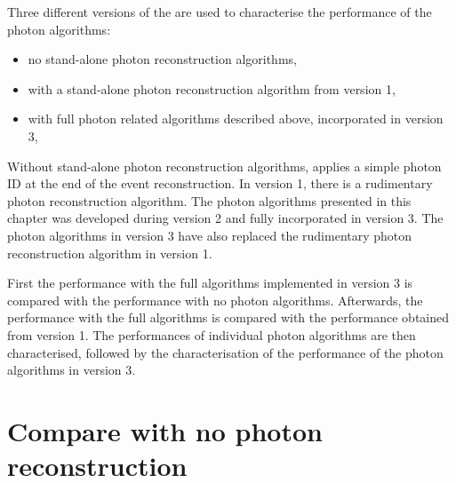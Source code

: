 
Three different versions of the \pandora are used to characterise  the performance of the photon algorithms:
\begin{itemize}
  \item no stand-alone photon reconstruction algorithms,
  \item with a stand-alone photon reconstruction algorithm from \pandora version 1,
  \item with full photon related algorithms described above, incorporated in \pandora version 3,
\end{itemize}

Without stand-alone photon reconstruction algorithms, \pandora applies a simple photon ID at the end of the event reconstruction. In \pandora version 1, there is a rudimentary photon reconstruction algorithm. The photon algorithms presented in this chapter was developed during \pandora version 2 and fully incorporated in \pandora version 3. The photon algorithms in \pandora version 3 have also replaced the rudimentary  photon reconstruction algorithm in \pandora version 1.

First the performance with the full algorithms implemented in \pandora version 3 is compared with the performance with no photon algorithms. Afterwards, the performance with  the full algorithms is compared with the performance obtained from  \pandora version 1. The performances of individual photon algorithms are then characterised, followed by the characterisation of the performance of the photon algorithms in \pandora version 3.

\section{Compare with no photon reconstruction}

